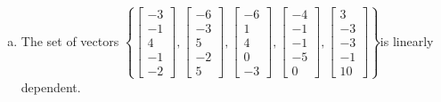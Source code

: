 \begin{exerciseAnswer}
\begin{enumerate}[(a)]
\item  The set of vectors \( \left\{ \left[\begin{array}{c}
-3 \\
-1 \\
4 \\
-1 \\
-2
\end{array}\right] , \left[\begin{array}{c}
-6 \\
-3 \\
5 \\
-2 \\
5
\end{array}\right] , \left[\begin{array}{c}
-6 \\
1 \\
4 \\
0 \\
-3
\end{array}\right] , \left[\begin{array}{c}
-4 \\
-1 \\
-1 \\
-5 \\
0
\end{array}\right] , \left[\begin{array}{c}
3 \\
-3 \\
-3 \\
-1 \\
10
\end{array}\right] \right\} \)is linearly dependent.
\end{enumerate}
    
\end{exerciseAnswer}
    
